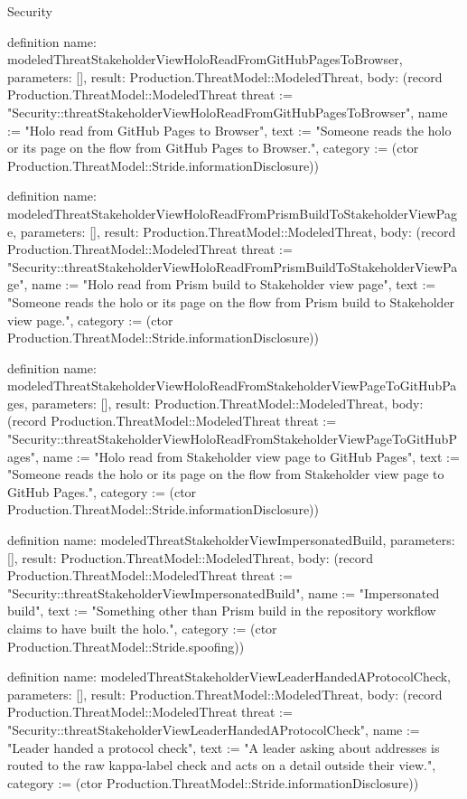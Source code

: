 \begin{lexlean}{Security}
\begin{semanticmodule}
definition{
  name: modeledThreatStakeholderViewHoloReadFromGitHubPagesToBrowser,
  parameters: [],
  result: Production.ThreatModel::ModeledThreat,
  body: (record Production.ThreatModel::ModeledThreat {threat := "Security::threatStakeholderViewHoloReadFromGitHubPagesToBrowser", name := "Holo read from GitHub Pages to Browser", text := "Someone reads the holo or its page on the flow from GitHub Pages to Browser.", category := (ctor Production.ThreatModel::Stride.informationDisclosure)})
}

definition{
  name: modeledThreatStakeholderViewHoloReadFromPrismBuildToStakeholderViewPage,
  parameters: [],
  result: Production.ThreatModel::ModeledThreat,
  body: (record Production.ThreatModel::ModeledThreat {threat := "Security::threatStakeholderViewHoloReadFromPrismBuildToStakeholderViewPage", name := "Holo read from Prism build to Stakeholder view page", text := "Someone reads the holo or its page on the flow from Prism build to Stakeholder view page.", category := (ctor Production.ThreatModel::Stride.informationDisclosure)})
}

definition{
  name: modeledThreatStakeholderViewHoloReadFromStakeholderViewPageToGitHubPages,
  parameters: [],
  result: Production.ThreatModel::ModeledThreat,
  body: (record Production.ThreatModel::ModeledThreat {threat := "Security::threatStakeholderViewHoloReadFromStakeholderViewPageToGitHubPages", name := "Holo read from Stakeholder view page to GitHub Pages", text := "Someone reads the holo or its page on the flow from Stakeholder view page to GitHub Pages.", category := (ctor Production.ThreatModel::Stride.informationDisclosure)})
}

definition{
  name: modeledThreatStakeholderViewImpersonatedBuild,
  parameters: [],
  result: Production.ThreatModel::ModeledThreat,
  body: (record Production.ThreatModel::ModeledThreat {threat := "Security::threatStakeholderViewImpersonatedBuild", name := "Impersonated build", text := "Something other than Prism build in the repository workflow claims to have built the holo.", category := (ctor Production.ThreatModel::Stride.spoofing)})
}

definition{
  name: modeledThreatStakeholderViewLeaderHandedAProtocolCheck,
  parameters: [],
  result: Production.ThreatModel::ModeledThreat,
  body: (record Production.ThreatModel::ModeledThreat {threat := "Security::threatStakeholderViewLeaderHandedAProtocolCheck", name := "Leader handed a protocol check", text := "A leader asking about addresses is routed to the raw kappa-label check and acts on a detail outside their view.", category := (ctor Production.ThreatModel::Stride.informationDisclosure)})
}


\end{semanticmodule}
\end{lexlean}
